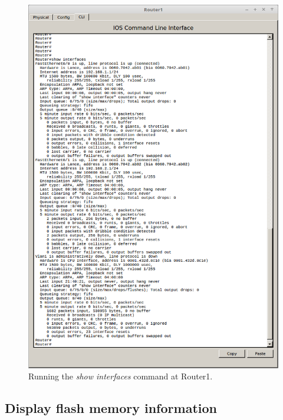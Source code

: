 \documentclass{article}
\begin{document}
\begin{figure}[!h]
\centering
    \includegraphics[scale=0.4]{2routerstat}
    \caption{Running the \textit{show interfaces} command at Router1.}
    \label{fig:2routerstat}
\end{figure}


\subsection{Display flash memory information}
\end{document}
